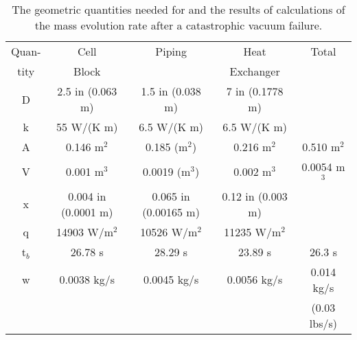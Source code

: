 {\begin{table}[htb]
\begin{center}
\begin{tabular}{|c|c|c|c|c|} \hline
Quan- & Cell  & Piping & Heat      & Total \\ 
tity  & Block &        & Exchanger &   
 \\ \hline
D & 2.5 in (0.063 m) & 1.5 in (0.038 m) &7 in (0.1778 m) & \\ \hline
k & 55 W/(K m) & 6.5 W/(K m) & 6.5 W/(K m) & \\ \hline
A & 0.146 m$^2$ & 0.185 (m$^2$) & 0.216 m$^2$ & 0.510 m$^2$ \\ \hline
V & 0.001 m$^3$ & 0.0019 (m$^3$) &0.002 m$^3$ & 0.0054 m$^3$ \\ \hline
x & 0.004 in (0.0001 m) &  0.065 in (0.00165 m) & 0.12 in (0.003 m) & \\ \hline
q & 14903 W/m$^2$ & 10526 W/m$^2$ & 11235 W/m$^2$ & \\ \hline
t$_{b}$ & 26.78 s & 28.29 s & 23.89 s & 26.3 s \\ \hline
w & 0.0038 kg/s & 0.0045 kg/s & 0.0056 kg/s & 0.014 kg/s \\
& & & &  (0.03 lbs/s) \\ \hline 
\end{tabular}
\end{center}
\caption[Cryotarget: Volumes and Geometry]{ The geometric quantities needed for and the results
of calculations of the mass evolution rate after a catastrophic vacuum
failure.} 
\label{ta:geo}
\end{table}

}
